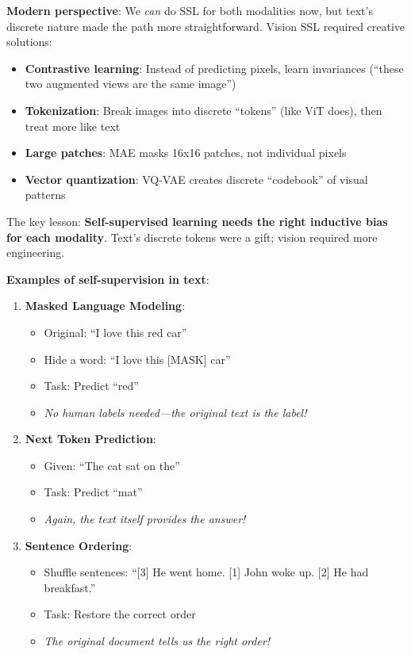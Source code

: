 \documentclass{article}
\begin{document}
\textbf{Modern perspective}: We \textit{can} do SSL for both modalities now, but text's discrete nature made the path more straightforward. Vision SSL required creative solutions:

\begin{itemize}
\item \textbf{Contrastive learning}: Instead of predicting pixels, learn invariances (``these two augmented views are the same image'')
\item \textbf{Tokenization}: Break images into discrete ``tokens'' (like ViT does), then treat more like text
\item \textbf{Large patches}: MAE masks 16x16 patches, not individual pixels
\item \textbf{Vector quantization}: VQ-VAE creates discrete ``codebook'' of visual patterns
\end{itemize}

The key lesson: \textbf{Self-supervised learning needs the right inductive bias for each modality}. Text's discrete tokens were a gift; vision required more engineering.

\textbf{Examples of self-supervision in text}:

\begin{enumerate}
\item \textbf{Masked Language Modeling}:
\begin{itemize}
\item Original: ``I love this red car''
\item Hide a word: ``I love this [MASK] car''
\item Task: Predict ``red''
\item \textit{No human labels needed---the original text is the label!}
\end{itemize}

\item \textbf{Next Token Prediction}:
\begin{itemize}
\item Given: ``The cat sat on the''
\item Task: Predict ``mat''
\item \textit{Again, the text itself provides the answer!}
\end{itemize}

\item \textbf{Sentence Ordering}:
\begin{itemize}
\item Shuffle sentences: ``[3] He went home. [1] John woke up. [2] He had breakfast.''
\item Task: Restore the correct order
\item \textit{The original document tells us the right order!}
\end{itemize}
\end{enumerate}
\end{document}
